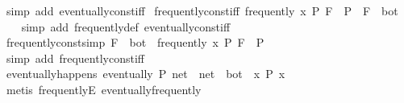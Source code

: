 \begin{isabellebody}
%
\isatagproof
{}\isamarkupfalse%
\ {\isacharparenleft}{\kern0pt}simp\ add{\isacharcolon}{\kern0pt}\ eventually{\isacharunderscore}{\kern0pt}const{\isacharunderscore}{\kern0pt}iff{\isacharparenright}{\kern0pt}%
\endisatagproof
{\isafoldproof}%
%
\isadelimproof
\isanewline
%
\endisadelimproof
\isanewline
{}\isamarkupfalse%
\ frequently{\isacharunderscore}{\kern0pt}const{\isacharunderscore}{\kern0pt}iff{\isacharcolon}{\kern0pt}\ {\isachardoublequoteopen}frequently\ {\isacharparenleft}{\kern0pt}{\isasymlambda}x{\isachardot}{\kern0pt}\ P{\isacharparenright}{\kern0pt}\ F\ {\isasymlongleftrightarrow}\ P\ {\isasymand}\ F\ {\isasymnoteq}\ bot{\isachardoublequoteclose}\isanewline
%
\isadelimproof
\ \ %
\endisadelimproof
%
\isatagproof
{}\isamarkupfalse%
\ {\isacharparenleft}{\kern0pt}simp\ add{\isacharcolon}{\kern0pt}\ frequently{\isacharunderscore}{\kern0pt}def\ eventually{\isacharunderscore}{\kern0pt}const{\isacharunderscore}{\kern0pt}iff{\isacharparenright}{\kern0pt}%
\endisatagproof
{\isafoldproof}%
%
\isadelimproof
\isanewline
%
\endisadelimproof
\isanewline
{}\isamarkupfalse%
\ frequently{\isacharunderscore}{\kern0pt}const{\isacharbrackleft}{\kern0pt}simp{\isacharbrackright}{\kern0pt}{\isacharcolon}{\kern0pt}\ {\isachardoublequoteopen}F\ {\isasymnoteq}\ bot\ {\isasymLongrightarrow}\ frequently\ {\isacharparenleft}{\kern0pt}{\isasymlambda}x{\isachardot}{\kern0pt}\ P{\isacharparenright}{\kern0pt}\ F\ {\isasymlongleftrightarrow}\ P{\isachardoublequoteclose}\isanewline
%
\isadelimproof
\ \ %
\endisadelimproof
%
\isatagproof
{}\isamarkupfalse%
\ {\isacharparenleft}{\kern0pt}simp\ add{\isacharcolon}{\kern0pt}\ frequently{\isacharunderscore}{\kern0pt}const{\isacharunderscore}{\kern0pt}iff{\isacharparenright}{\kern0pt}%
\endisatagproof
{\isafoldproof}%
%
\isadelimproof
\isanewline
%
\endisadelimproof
\isanewline
{}\isamarkupfalse%
\ eventually{\isacharunderscore}{\kern0pt}happens{\isacharcolon}{\kern0pt}\ {\isachardoublequoteopen}eventually\ P\ net\ {\isasymLongrightarrow}\ net\ {\isacharequal}{\kern0pt}\ bot\ {\isasymor}\ {\isacharparenleft}{\kern0pt}{\isasymexists}x{\isachardot}{\kern0pt}\ P\ x{\isacharparenright}{\kern0pt}{\isachardoublequoteclose}\isanewline
%
\isadelimproof
\ \ %
\endisadelimproof
%
\isatagproof
{}\isamarkupfalse%
\ {\isacharparenleft}{\kern0pt}metis\ frequentlyE\ eventually{\isacharunderscore}{\kern0pt}frequently{\isacharparenright}{\kern0pt}%
\endisatagproof
{\isafoldproof}%
%
\isadelimproof
\isanewline
%
\endisadelimproof
\isanewline
{}\isamarkupfalse%

\end{isabellebody}
